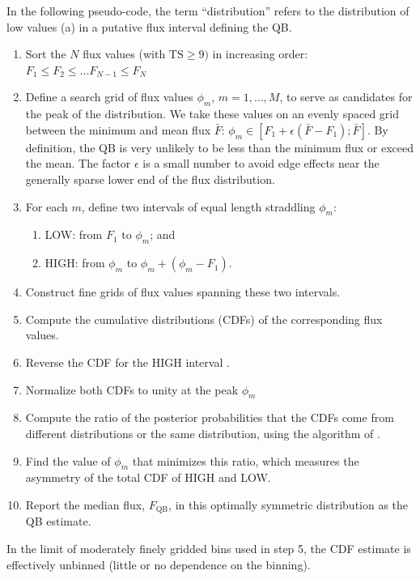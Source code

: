 \documentclass[twocolumn]{aastex62}
\begin{document}
In the following pseudo-code, the term ``distribution''
refers to the distribution of low values (a) in a putative
flux interval defining the QB.
\begin{enumerate}
\item Sort the $N$ flux values (with $\mathrm{TS} \geqslant 9)$ in increasing order:
$F_{1} \leqslant F_{2} \leqslant \dots F_{N-1}   \leqslant F_{N} $
\item Define a search grid of flux values $\phi_{m}$, $m = 1,\ldots,M$, 
to serve as candidates for the peak of the distribution. We take these 
values on an evenly spaced grid between the minimum and mean flux $\bar{F}$:
$\phi_m \in [F_1 + \epsilon (\bar{F} - F_1); \bar{F}]$.
By definition, the QB is very unlikely to be less than the
minimum flux or exceed the mean.
The factor $\epsilon$ is a small number to  avoid edge effects 
near the generally sparse lower end of the flux distribution.
\item For each $m$, define two intervals  of equal length straddling  $\phi_m$: 
    \begin{enumerate}
    \item LOW: from $F_{1}$ to $\phi_m$; and
    \item HIGH: from $\phi_m$ to $\phi_m + (\phi_m - F_{1})$.
    \end{enumerate}

\item Construct fine grids of flux values spanning these two intervals.
\item Compute the cumulative distributions (CDFs) of the
corresponding flux values.
\item Reverse the  CDF for the HIGH interval .
\item Normalize both CDFs to unity at the peak $\phi_m$
\item Compute the ratio of the posterior probabilities that the CDFs come from different distributions or the same distribution,  using the algorithm of \citet{Wolpert1996}.
\item Find the value of $\phi_m$ that minimizes this ratio, which measures the asymmetry of the total CDF of HIGH and LOW.
\item Report the median flux, $F_\mathrm{QB}$, in this
optimally symmetric distribution as the QB estimate.
\end{enumerate}
\noindent
In the limit of moderately finely gridded bins 
used in step 5, the CDF estimate is effectively
unbinned (little or no dependence
on the binning).
\end{document}

